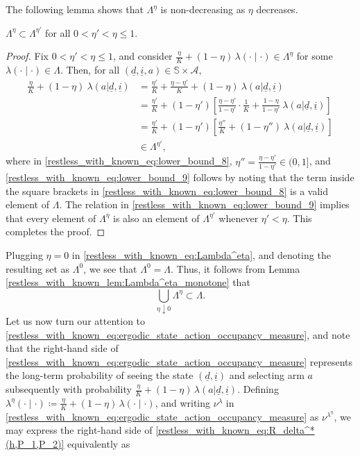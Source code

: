 The following lemma shows that $\Lambda^\eta$ is non-decreasing as $\eta$ decreases.
\begin{lemma}\label{restless_with_known_lem:Lambda^eta_monotone}
	$\Lambda^\eta\subset  \Lambda^{\eta'}$ for all $0<\eta'< \eta\leq 1$.
\end{lemma}
\begin{proof}
Fix $0<\eta'<\eta\leq 1$, and consider $\frac{\eta}{K}+(1-\eta)\,\lambda(\cdot\mid \cdot)\in \Lambda^\eta$ for some $\lambda(\cdot\mid \cdot)\in \Lambda$. Then, for all $(\underline{d},\underline{i},a)\in\mathbb{S}\times\mathcal{A}$,
\begingroup \allowdisplaybreaks\begin{align}
	\frac{\eta}{K}+(1-\eta)~\lambda(a|\underline{d},\underline{i})
	&=\frac{\eta'}{K}+\frac{\eta-\eta'}{K}+(1-\eta)~\lambda(a|\underline{d},\underline{i})\nonumber\\
	&=\frac{\eta'}{K}+(1-\eta')\left[\frac{\eta-\eta'}{1-\eta'}\cdot \frac{1}{K}+\frac{1-\eta}{1-\eta'}~\lambda(a|\underline{d},\underline{i})\right]\nonumber\\
	&=\frac{\eta'}{K}+(1-\eta')\left[\frac{\eta''}{K}+(1-\eta'')~\lambda(a|\underline{d},\underline{i})\right]\label{restless_with_known_eq:lower_bound_8}\\
	&\in \Lambda^{\eta'},\label{restless_with_known_eq:lower_bound_9}
\end{align}\endgroup
where in \eqref{restless_with_known_eq:lower_bound_8}, $\eta''=\frac{\eta-\eta'}{1-\eta'}\in (0,1]$, and \eqref{restless_with_known_eq:lower_bound_9} follows by noting that the term inside the square brackets in \eqref{restless_with_known_eq:lower_bound_8} is a valid element of $\Lambda$. The relation in \eqref{restless_with_known_eq:lower_bound_9} implies that every element of $\Lambda^\eta$ is also an element of $\Lambda^{\eta'}$ whenever $\eta'<\eta$. This completes the proof.
\end{proof}
Plugging $\eta=0$ in \eqref{restless_with_known_eq:Lambda^eta}, and denoting the resulting set as $\Lambda^0$, we see that $\Lambda^{0}=\Lambda$. Thus, it follows from Lemma \ref{restless_with_known_lem:Lambda^eta_monotone} that
\begin{equation}
	\bigcup\limits_{\eta\downarrow 0}\Lambda^\eta \subset \Lambda.\label{restless_with_known_eq:lim_Lambda^eta_subset_of_Lambda^0}
\end{equation}
Let us now turn our attention to \eqref{restless_with_known_eq:ergodic_state_action_occupancy_measure}, and note that the right-hand side of \eqref{restless_with_known_eq:ergodic_state_action_occupancy_measure} represents the long-term probability of seeing the state $(\underline{d},\underline{i})$ and selecting arm $a$ subsequently with probability $\frac{\eta}{K}+(1-\eta)\,\lambda(a|\underline{d},\underline{i})$. Defining $\lambda^\eta(\cdot\mid\cdot) \coloneqq \frac{\eta}{K}+(1-\eta)\,\lambda(\cdot\mid\cdot)$, and writing $\nu^\lambda$ in \eqref{restless_with_known_eq:ergodic_state_action_occupancy_measure} as $\nu^{\lambda^\eta}$, we may express the right-hand side of \eqref{restless_with_known_eq:R_delta^*(h,P_1,P_2)} equivalently as 

